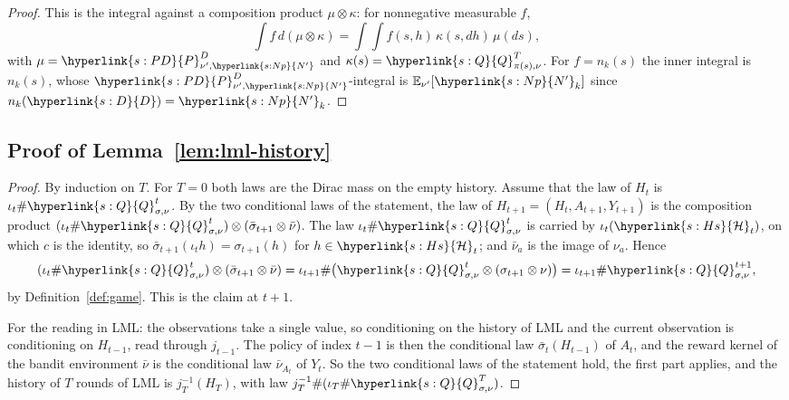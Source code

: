\documentclass[11pt]{article}
\newcommand{\sy}[2]{\hyperlink{#1}{#2}}
\newcommand{\E}{\mathbb{E}}
\newcommand{\Hs}{\sy{s:Hs}{\mathcal{H}}}
\newcommand{\Np}{\sy{s:Np}{N'}}
\newcommand{\Dd}{\sy{s:D}{D}}
\newcommand{\PD}{\sy{s:PD}{P}^{D}}
\newcommand{\Q}{\sy{s:Q}{Q}}
\begin{document}
\begin{proof}
This is the integral against a composition product $\mu\otimes\kappa$: for nonnegative measurable
$f$,
\begin{equation*}
\int f\,d(\mu\otimes\kappa)=\int\!\!\int f(s,h)\,\kappa(s,dh)\,\mu(ds),
\end{equation*}
with $\mu=\PD_{\nu',\Np}$ and $\kappa(s)=\Q^T_{\pi(s),\nu}$. For $f=n_k(s)$ the inner integral is
$n_k(s)$, whose $\PD_{\nu',\Np}$-integral is $\E_{\nu'}[\Np_k]$ since $n_k(\Dd)=\Np_k$.
\end{proof}

\subsection{Proof of Lemma~\ref{lem:lml-history}}\label{sec:proof-lml-history}

\begin{proof}
By induction on $T$. For $T=0$ both laws are the Dirac mass on the empty history. Assume that the
law of $H_t$ is $\iota_t\#\Q^t_{\sigma,\nu}$. By the two conditional laws of the statement, the law
of $H_{t+1}=(H_t,A_{t+1},Y_{t+1})$ is the composition product
$(\iota_t\#\Q^t_{\sigma,\nu})\otimes(\bar\sigma_{t+1}\otimes\bar\nu)$. The law $\iota_t\#\Q^t_{\sigma,\nu}$
is carried by $\iota_t(\Hs_t)$, on which $c$ is the identity, so
$\bar\sigma_{t+1}(\iota_th)=\sigma_{t+1}(h)$ for $h\in\Hs_t$; and $\bar\nu_a$ is the image of $\nu_a$.
Hence
\begin{equation*}
(\iota_t\#\Q^t_{\sigma,\nu})\otimes(\bar\sigma_{t+1}\otimes\bar\nu)
=\iota_{t+1}\#\big(\Q^t_{\sigma,\nu}\otimes(\sigma_{t+1}\otimes\nu)\big)=\iota_{t+1}\#\Q^{t+1}_{\sigma,\nu},
\end{equation*}
by Definition~\ref{def:game}. This is the claim at $t+1$.

For the reading in LML: the observations take a single value, so conditioning on the history of
LML and the current observation is conditioning on $H_{t-1}$, read through $j_{t-1}$. The policy
of index $t-1$ is then the conditional law $\bar\sigma_t(H_{t-1})$ of $A_t$, and the reward
kernel of the bandit environment $\bar\nu$ is the conditional law $\bar\nu_{A_t}$ of $Y_t$. So the
two conditional laws of the statement hold, the first part applies, and the history of $T$ rounds
of LML is $j_T^{-1}(H_T)$, with law $j_T^{-1}\#(\iota_T\#\Q^T_{\sigma,\nu})$.
\end{proof}
\end{document}
